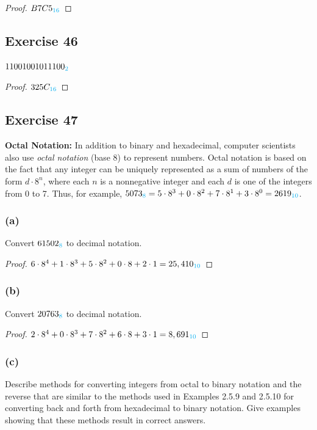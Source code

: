 \documentclass[14pt]{extarticle}
\newcommand{\base}[1]{{\color{cyan}#1}}
\begin{document}
\begin{proof}
$B7C5_\base{16}$
\end{proof}

\subsection{Exercise 46}
$11001001011100_\base{2}$

\begin{proof}
$325C_\base{16}$
\end{proof}

\subsection{Exercise 47}
{\bf Octal Notation:} In addition to binary and hexadecimal, computer scientists also use {\it octal notation} (base 8) to
represent numbers. Octal notation is based on the fact that any integer can be uniquely represented as a sum of numbers of the form $d \cdot 8^n$, where each $n$ is a nonnegative integer and each $d$ is one of the integers from 0 to 7. Thus, for example, $5073_\base{8} = 5 \cdot 8^3 + 0 \cdot 8^2 + 7 \cdot 8^1 + 3
\cdot 8^0 = 2619_\base{10}$.

\subsubsection{(a)}
Convert $61502_\base{8}$ to decimal notation.

\begin{proof}
$6\cdot8^4 + 1\cdot8^3 + 5\cdot8^2 + 0\cdot8 + 2\cdot1 = 25,410_\base{10}$
\end{proof}

\subsubsection{(b)}
Convert $20763_\base{8}$ to decimal notation.

\begin{proof}
$2\cdot8^4 + 0\cdot8^3 + 7\cdot8^2 + 6\cdot8 + 3\cdot1 = 8,691_\base{10}$
\end{proof}

\subsubsection{(c)}
Describe methods for converting integers from octal to binary notation and the reverse that are similar to the methods used in Examples 2.5.9 and 2.5.10 for converting back and forth from hexadecimal to binary notation. Give examples showing that these methods result in correct answers.
\end{document}
